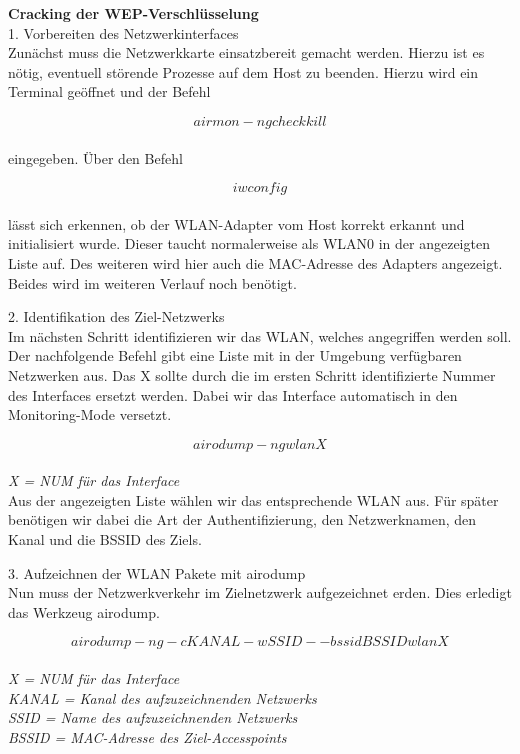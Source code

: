 \textbf{\Large{Cracking der WEP-Verschlüsselung}}\\ 

{\Large 1. Vorbereiten des Netzwerkinterfaces}\\
Zunächst muss die Netzwerkkarte einsatzbereit gemacht werden. Hierzu ist es nötig, eventuell störende Prozesse auf dem Host zu beenden. Hierzu wird ein Terminal geöffnet und der Befehl

$$airmon-ng check kill$$\\

eingegeben. Über den Befehl 

$$iwconfig$$\\ 

lässt sich erkennen, ob der WLAN-Adapter vom Host korrekt erkannt und initialisiert wurde. Dieser taucht normalerweise als WLAN0 in der angezeigten Liste auf. Des weiteren wird hier auch die MAC-Adresse des Adapters angezeigt. 
Beides wird im weiteren Verlauf noch benötigt.

{\Large 2. Identifikation des Ziel-Netzwerks}\\

Im nächsten Schritt identifizieren wir das WLAN, welches angegriffen werden soll. Der nachfolgende Befehl gibt eine Liste mit in der Umgebung verfügbaren Netzwerken aus. Das X sollte durch die im ersten Schritt identifizierte Nummer des Interfaces ersetzt werden. Dabei wir das Interface automatisch in den Monitoring-Mode versetzt. 

$$airodump-ng wlanX$$\\
\textit{X = NUM für das Interface}\\

Aus der angezeigten Liste wählen wir das entsprechende WLAN aus. Für später benötigen wir dabei die Art der Authentifizierung, den Netzwerknamen, den Kanal und die BSSID des Ziels.

{\Large 3. Aufzeichnen der WLAN Pakete mit airodump}\\
Nun muss der Netzwerkverkehr im Zielnetzwerk aufgezeichnet erden. Dies erledigt das Werkzeug airodump.

$$airodump-ng -c KANAL -w SSID --bssid BSSID wlanX$$\\
\textit{X = NUM für das Interface}\\
\textit{KANAL = Kanal des aufzuzeichnenden Netzwerks}\\
\textit{SSID = Name des aufzuzeichnenden Netzwerks}\\
\textit{BSSID = MAC-Adresse des Ziel-Accesspoints}\\

